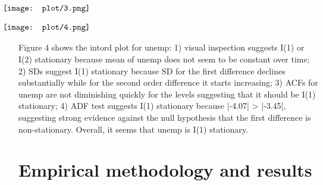 \documentclass[12pt, times]{article}
\begin{document}
\begin{figure}[H]
\begin{center}
$
\begin{array}
[c]{cc}%
\makebox[0pt]{\texttt{[image: plot/3.png]}}
\end{array}
$
\end{center}
\vspace{-1.5em}
\caption{}
\end{figure}
\vspace{-1.5em}

\begin{figure}[H]
\begin{center}
$
\begin{array}
[c]{cc}%
\makebox[0pt]{\texttt{[image: plot/4.png]}}
\end{array}
$
\end{center}
\vspace{-1.5em}
\caption{}
\end{figure}
\vspace{-1.5em}
\hspace{1.5em}Figure 4 shows the intord plot for unemp: 1) visual inspection suggests I(1) or I(2) stationary because mean of unemp does not seem to be constant over time; 2) SDs suggest I(1) stationary because SD for the first difference declines substantially while for the second order difference it starts increasing; 3) ACFs for unemp are not diminishing quickly for the levels suggesting that it should be I(1) stationary; 4) ADF test suggests I(1) stationary because |-4.07| > |-3.45|, suggesting strong evidence against the null hypothesis that the first difference is non-stationary. Overall, it seems that unemp is I(1) stationary.
\vspace{-1.5em}
\section{Empirical methodology and results}
\end{document}
